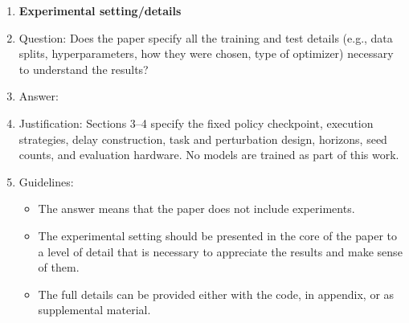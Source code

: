 \documentclass{article}
\begin{document}
\begin{enumerate}
\item {\bf Experimental setting/details}
    \item[] Question: Does the paper specify all the training and test details (e.g., data splits, hyperparameters, how they were chosen, type of optimizer) necessary to understand the results?
    \item[] Answer: \answerYes{}
    \item[] Justification: Sections 3–4 specify the fixed policy checkpoint, execution strategies, delay construction, task and perturbation design, horizons, seed counts, and evaluation hardware. No models are trained as part of this work.
    \item[] Guidelines:
    \begin{itemize}
        \item The answer \answerNA{} means that the paper does not include experiments.
        \item The experimental setting should be presented in the core of the paper to a level of detail that is necessary to appreciate the results and make sense of them.
        \item The full details can be provided either with the code, in appendix, or as supplemental material.
    \end{itemize}


\end{enumerate}
\end{document}
